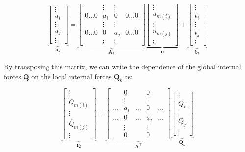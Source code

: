 $$
\underbrace{
\begin{bmatrix}
\vdots \\ u_{i} \\ \vdots \\ u_{j} \\ \vdots
\end{bmatrix}
}_{\boldsymbol{u}_{k}}
=
\underbrace{
\begin{bmatrix}
& \vdots & \vdots & \\
0 \hdots 0 & a_{i} & 0 & 0 \hdots 0 \\
& \vdots & \vdots & \\
0 \hdots 0 & 0 & a_{j} & 0 \hdots 0 \\
& \vdots & \vdots &
\end{bmatrix}
}_{\boldsymbol{A}_{k}}
\underbrace{
\begin{bmatrix}
\vdots \\ u_{m(i)} \\ \vdots \\ u_{m(j)} \\ \vdots
\end{bmatrix}
}_{\boldsymbol{u}}
+
\underbrace{
\begin{bmatrix}
\vdots \\ b_{i} \\ \vdots \\ b_{j} \\ \vdots
\end{bmatrix}
}_{\boldsymbol{b}_{k}}
$$

By transposing this matrix, we can write the dependence of the global internal forces $\boldsymbol{Q}$ on the local internal forces $\boldsymbol{Q}_{k}$ as:

$$
\underbrace{
\begin{bmatrix}
\vdots \\ \overline{Q}_{m(i)} \\ \vdots \\ \overline{Q}_{m(j)} \\ \vdots
\end{bmatrix}
}_{\boldsymbol{Q}}
=
\underbrace{
\begin{bmatrix}
& 0 & & 0 & \\
& \vdots & & \vdots & \\
\hdots & a_{i} & \hdots & 0 & \hdots \\
\hdots & 0 & \hdots & a_{j} & \hdots \\
& \vdots & & \vdots & \\
& 0 & & 0 &
\end{bmatrix}
}_{\boldsymbol{A}^\intercal}
\underbrace{
\begin{bmatrix}
\vdots \\ Q_{i} \\ \vdots \\ Q_{j} \\ \vdots
\end{bmatrix}
}_{\boldsymbol{Q}_{k}}
$$

